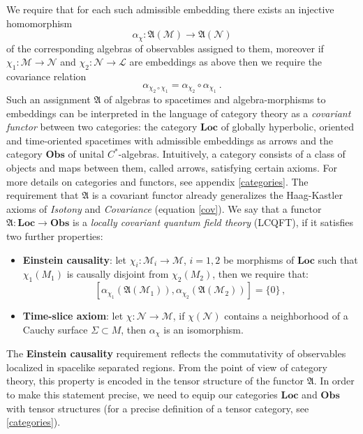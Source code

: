 \documentclass[12pt]{article}
\newcommand{\fA}{\mathfrak{A}}
\newcommand{\Lcal}{\mathcal {L}}
\newcommand{\Ncal}{\mathcal{N}}
\newcommand{\Mcal}{\mathcal{M}}
\newcommand{\Loc}{\mathrm{\mathbf{Loc}}}       %
\newcommand{\Obs}{\mathrm{\mathbf{Obs}}}       %
\newcommand{\al}{\alpha}
\newcommand{\1}{\mathds{1}}                         %
\newcommand{\be}{\begin{equation}}
\newcommand{\ee}{\end{equation}}
\begin{document}
We require that for each such admissible embedding there exists an injective homomorphism 
\be
\alpha_{\chi}:\mathfrak{A}(\Mcal)\to\mathfrak{A}(\Ncal)
\ee
of the corresponding algebras of observables assigned to them, moreover if $\chi_1:\Mcal\to \Ncal$ and $\chi_2:\Ncal\to \Lcal$ are embeddings as above then we require the covariance relation
\be\label{cov}
\alpha_{\chi_2\circ\chi_1}=\alpha_{\chi_2}\circ\alpha_{\chi_1} \ .
\ee
Such an assignment $\mathfrak{A}$ of algebras to spacetimes and algebra-morphisms to embeddings can be interpreted in the language of category theory as a \textit{covariant functor} between two categories: the category $\Loc$ of globally hyperbolic, oriented and time-oriented spacetimes with admissible embeddings as arrows and the category $\Obs$ of unital $C^*$-algebras. Intuitively, a category consists of a class of objects and maps between them, called arrows, satisfying certain axioms. For more details on categories and functors, see appendix \ref{categories}. The requirement that $\fA$ is a covariant functor  already generalizes the Haag-Kastler axioms of \textit{Isotony} and \textit{Covariance} (equation \eqref{cov}). We say that a functor $\mathfrak{A}: \Loc\rightarrow \Obs$ is a \textit{locally covariant quantum field theory} (LCQFT), if it satisfies two further properties:
\begin{itemize}
\item \textbf{Einstein causality}: let $\chi_i:\Mcal_i\rightarrow \Mcal$, $i=1,2$ be morphisms of $\Loc$ such that $\chi_1(M_1)$ is causally disjoint from $\chi_2(M_2)$, then we require that:
\[
[\al_{\chi_1}(\fA(\Mcal_1)),\al_{\chi_2}(\fA(\Mcal_2))]=\{0\}\,,
\]
\item \textbf{Time-slice axiom}: let $\chi:\Ncal\rightarrow \Mcal$, if $\chi(\Ncal)$ contains a neighborhood of a Cauchy surface $\Sigma\subset M$, then $\al_\chi$ is an isomorphism.
\end{itemize}

The \textbf{Einstein causality} requirement reflects the commutativity of observables localized in spacelike separated regions. From the point of view of category theory, this property is encoded in the tensor structure of the functor $\mathfrak{A}$. In order to make this statement precise, we need to equip our categories $\Loc$ and $\Obs$ with tensor structures (for a precise definition of a tensor category, see \ref{categories}).
\end{document}
